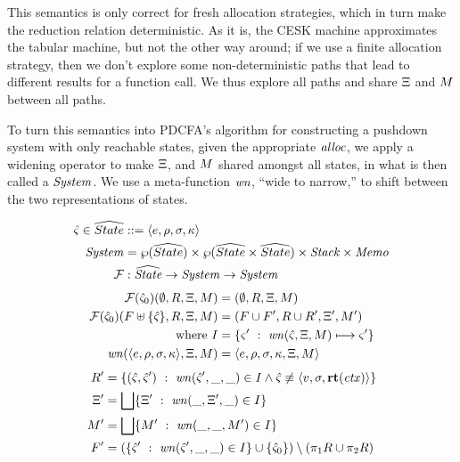This semantics is only correct for fresh allocation strategies, which in turn make the reduction relation deterministic.
%
As it is, the CESK machine approximates the tabular machine, but not the other way around;
%
if we use a finite allocation strategy, then we don't explore some non-deterministic paths that lead to different results for a function call.
%
We thus explore all paths and share $\Xi$ and $M$ between all paths.

To turn this semantics into PDCFA's algorithm for constructing a pushdown system with only reachable states, given the appropriate $\mathit{alloc}$, we apply a widening operator to make $\Xi$, and $M$ shared amongst all states, in what is then called a $\mathit{System}$. We use a meta-function $\mathit{wn}$, ``wide to narrow,'' to shift between the two representations of states.
%

{
\setlength{\abovedisplayskip}{0pt}
\setlength{\belowdisplayskip}{4pt}
\setlength{\abovedisplayshortskip}{0pt}
\setlength{\belowdisplayshortskip}{8pt}
\begin{align*}
  \hat\varsigma \in \widehat{State} &::= \langle e,\rho,\sigma,\kappa \rangle \\
  \mathit{System} &= \wp(\widehat{State}) \times \wp(\widehat{State} \times \widehat{State}) \times \mathit{Stack} \times \mathit{Memo} \\
  {\mathcal F} &: \widehat{\mathit{State}} \to \mathit{System} \to \mathit{System}
\end{align*}
\begin{align*}
  {\mathcal F}(\hat\varsigma_0)(\emptyset, R, \Xi, M) &= (\emptyset, R, \Xi, M) \\
  {\mathcal F}(\hat\varsigma_0)(F\uplus\{ \hat\varsigma \}, R, \Xi, M) &= (F\cup F', R \cup R', \Xi', M') \\
  \text{where } I &= \{ \varsigma'\ :\ \mathit{wn}(\hat\varsigma,\Xi,M) \longmapsto \varsigma'\} \\
                \mathit{wn}(\langle e,\rho,\sigma,\kappa \rangle,\Xi,M)
                   &= \langle e,\rho,\sigma,\kappa,\Xi,M \rangle
\end{align*}
\begin{align*}
    R' &= \setbuild{(\mastate,\mastate')}{\wn(\mastate', \_, \_) \in I \wedge \mastate\nequiv\tpl{\mval,\mstore,\krt{\mctx}}} \\
    \mktab' &=  \bigsqcup\setbuild{\mktab'}{\wn(\_, \mktab', \_) \in I} \\
    \mmemo' &= \bigsqcup\setbuild{\mmemo'}{\wn(\_, \_, \mmemo') \in I} \\
    F' &= (\setbuild{\mastate'}{\wn(\mastate', \_, \_) \in I} \cup \set{\mastate_0})\setminus (\pi_1 R \cup \pi_2 R)
  \end{align*}
}

